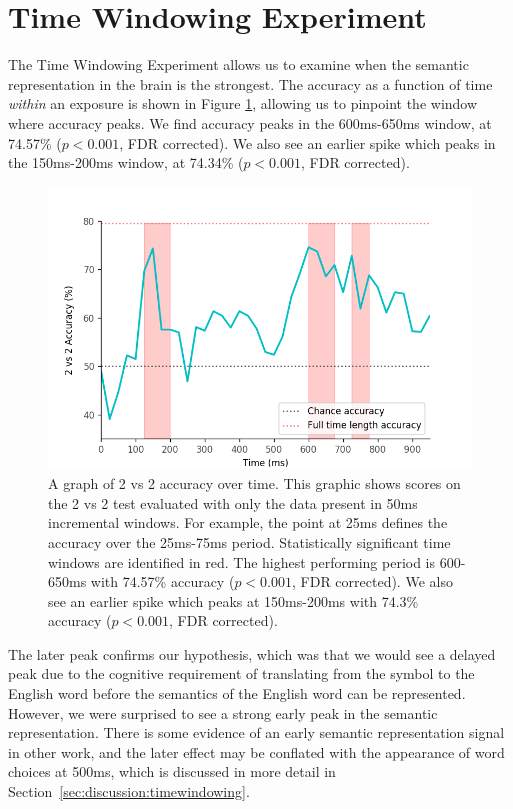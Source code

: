 \section{Time Windowing Experiment}
\label{sec:results:timewindowing}

The Time Windowing Experiment allows us to examine when the semantic 
representation in the brain is the strongest. The \tvt accuracy as a function 
of time \emph{within} an exposure is shown in Figure \ref{fig:timewindow}, 
allowing us to pinpoint the window where accuracy peaks. We find accuracy peaks 
in the 600ms-650ms window, at 74.57\% ($p < 0.001$, FDR corrected). We also see 
an earlier spike which peaks in the 150ms-200ms window, at 74.34\% ($p < 
0.001$, FDR corrected).

\begin{figure}[tp]
  \centering
  \includegraphics[width=0.75\linewidth]{figures/timewindow}
  \caption[\tvt Accuracy over Time]{
    A graph of 2 vs 2 accuracy over time. This graphic shows scores on the 2 vs 
    2 test evaluated with only the data present in 50ms incremental windows.  
    For example, the point at 25ms defines the \tvt accuracy over the 25ms-75ms 
    period. Statistically significant time windows are identified in red. The 
    highest performing period is 600-650ms with 74.57\% accuracy ($p < 0.001$, 
    FDR corrected). We also see an earlier spike which peaks at 150ms-200ms 
    with 74.3\% accuracy ($p < 0.001$, FDR corrected).
  }
  \label{fig:timewindow}
\end{figure}

The later peak confirms our hypothesis, which was that we would see a delayed
peak due to the cognitive requirement of translating from the symbol to the 
English word before the semantics of the English word can be represented.  
However, we were surprised to see a strong early peak in the semantic 
representation. There is some evidence of an early semantic representation 
signal in other work, and the later effect may be conflated with the appearance 
of word choices at 500ms, which is discussed in more detail in 
Section~\ref{sec:discussion:timewindowing}.
